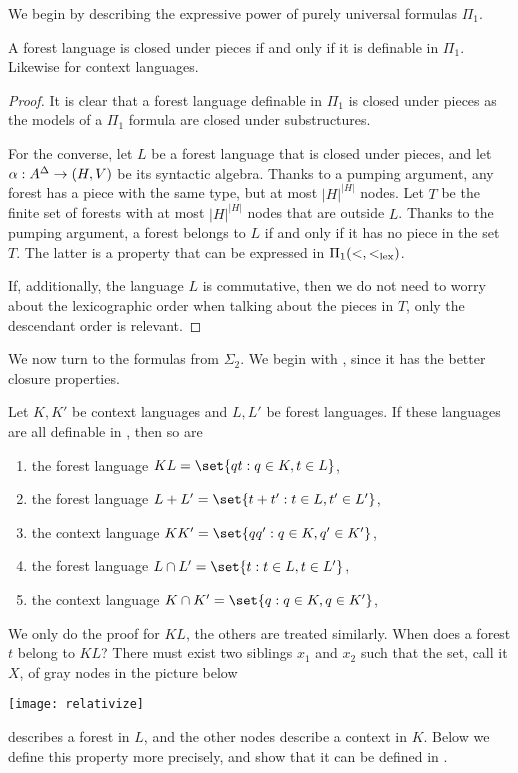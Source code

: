 \documentclass{LMCS}
\begin{document}
We begin by describing the expressive power of  purely universal formulas $\Pi_1$.
\begin{lem}\label{lem:pi1-lemma}
  A forest language is closed under pieces if
  and only if it is definable in $\Pi_1$.  Likewise for
  context languages.
\end{lem}
\begin{proof}
  It is clear that a forest language definable in $\Pi_1$ is closed under
  pieces as the models of a $\Pi_1$ formula are closed under substructures.

  For the converse, let $L$ be a forest language that is closed under pieces,
  and let $ \alpha : A^\Delta \to (H,V)$ be its syntactic algebra.  Thanks to a
  pumping argument, any forest has a piece with the same type, but at most
  $|H|^{|H|}$ nodes.  Let $T$ be the finite set of forests with at most
  $|H|^{|H|}$ nodes that are outside $L$. Thanks to the pumping argument, a
  forest belongs to $L$ if and only if it has no piece in the set $T$. The
  latter is a property that can be expressed in $\Pi_1(<, <_\mathrm{lex})$.
  
  If, additionally, the language $L$ is commutative, then we do not need
  to worry about the lexicographic order when talking about the pieces
  in $T$, only the descendant order is relevant.
\end{proof}

We now turn to the formulas from $\Sigma_2$. We begin  with \Stwol,
since it has the  better closure properties.
\begin{lem}\label{fact:simple-lex}
  Let $K,K'$ be context languages and $L,L'$ be forest languages. If
  these languages are all definable in \Stwol, then so are
\begin{enumerate}[\em(1)]
\item the forest language $KL=\set{qt: q \in K, t \in L}$,
\item the forest language $L+L' =\set{t+t' : t \in L, t' \in L'}$,
\item the context language $KK' = \set{qq' : q \in K, q' \in K'}$,
\item the forest language $L \cap L' =\set{t : t \in L, t \in L'}$,
\item the context language $K \cap K' = \set{q : q \in K, q \in K'}$,
\end{enumerate}
\end{lem}

\proof
  We only do the proof for $KL$, the others are treated similarly. 
When does a forest $t$ belong to $KL$? There must exist two siblings $x_1$ and $x_2$ such that the set, call it $X$, of gray nodes in the picture below
\medskip
\begin{center}
\texttt{[image: relativize]}
\end{center}
describes a forest in $L$, and the other nodes describe a context in $K$. Below
we define this property more precisely, and show that it can be defined in
\Stwol.
\end{document}
